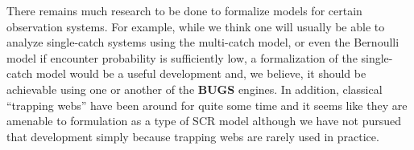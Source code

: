 There remains much research to be done to formalize models for certain
observation systems. For example, while we think one will usually be
able to analyze single-catch systems using the multi-catch model, or
even the Bernoulli model if encounter probability is sufficiently low,
a formalization of the single-catch model would be a useful
development and, we believe, it should be achievable using one or
another of the {\bf BUGS} engines.  In addition, classical ``trapping
webs'' \citep{anderson_etal:1983, wilson_anderson:1985b,
  jett_nichols:1987, parmenter_etal:1989,link_barker:1994}
have been around for quite
some time and it seems like they are amenable to formulation as a type
of SCR model although we have not pursued that development simply
because trapping webs are rarely used in practice.

